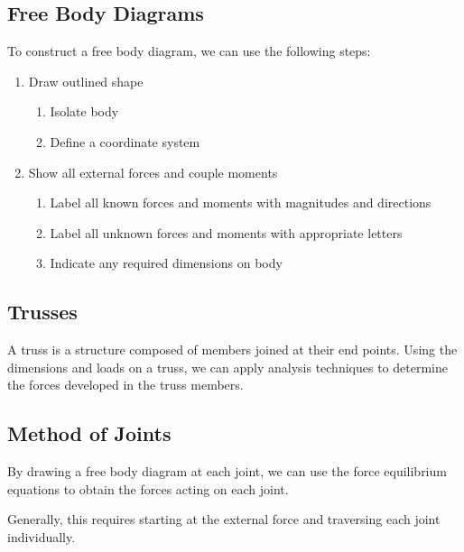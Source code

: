 \documentclass{article}
\begin{document}
\subsection{Free Body Diagrams}
To construct a free body diagram, we can use the following steps:
\begin{enumerate}
    \item Draw outlined shape
          \begin{enumerate}
              \item Isolate body
              \item Define a coordinate system
          \end{enumerate}
    \item Show all external forces and couple moments
          \begin{enumerate}
              \item Label all known forces and moments with magnitudes and directions
              \item Label all unknown forces and moments with appropriate letters
              \item Indicate any required dimensions on body
          \end{enumerate}
\end{enumerate}
\subsection{Trusses}
A truss is a structure composed of members joined at their end points.
Using the dimensions and loads on a truss, we can apply analysis techniques
to determine the forces developed in the truss members.
\subsection{Method of Joints}
By drawing a free body diagram at each joint,
we can use the force equilibrium equations to obtain the forces acting on each joint.

Generally, this requires starting at the external force and traversing each joint
individually.
\end{document}
